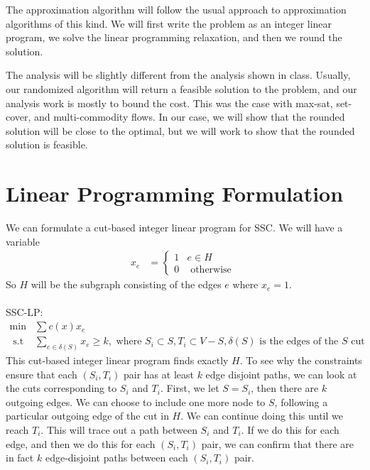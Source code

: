 \documentclass[12pt]{article}
\begin{document}
The approximation algorithm will follow the usual approach to approximation algorithms of this kind. We will first write the problem as an integer linear program, we solve the linear programming relaxation, and then we round the solution. 

The analysis will be slightly different from the analysis shown in class. Usually, our randomized algorithm will return a feasible solution to the problem, and our analysis work is mostly to bound the cost. This was the case with max-sat, set-cover, and multi-commodity flows. In our case, we will show that the rounded solution will be close to the optimal, but we will work to show that the rounded solution is feasible. 

\section{Linear Programming Formulation}

We can formulate a cut-based integer linear program for SSC. We will have a variable
\begin{align}
 x_e &= \left\{ \begin{array}{cc} 1 & e \in H \\
                                  0 & \text{ otherwise } \end{array} \right.
\end{align}
So $H$ will be the subgraph consisting of the edges $e$ where $x_e = 1$. \\ \\
SSC-LP:
\begin{align}
\min & \sum c(x) x_e  \\
\text{ s.t } & \sum_{e \in \delta(S)} x_e \geq k, \text{ where } S_i \subset S, T_i \subset V - S, \delta(S) \text{ is the edges of the $S$ cut }
\end{align}
This cut-based integer linear program finds exactly $H$. To see why the constraints ensure that each $(S_i, T_i)$ pair has at least $k$ edge disjoint paths, we can look at the cuts corresponding to $S_i$ and $T_i$. First, we let $S = S_i$, then there are $k$ outgoing edges. We can choose to include one more node to $S$, following a particular outgoing edge of the cut in $H$. We can continue doing this until we reach $T_i$. This will trace out a path between $S_i$ and $T_i$. If we do this for each edge, and then we do this for each $(S_i, T_i)$ pair, we can confirm that there are in fact $k$ edge-disjoint paths between each $(S_i, T_i)$ pair. 
\end{document}
